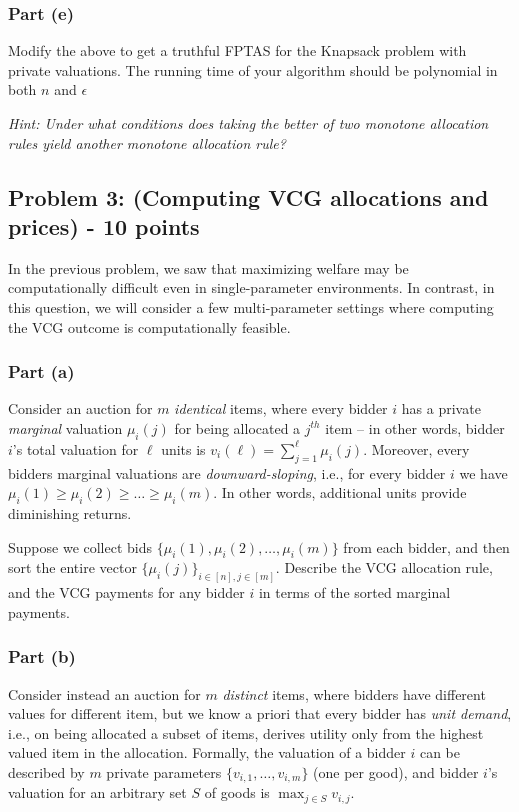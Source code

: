 \documentclass[letterpaper,11pt]{article}
\begin{document}
\subsubsection*{Part (e)} 
Modify the above to get a truthful FPTAS for the Knapsack problem with
private valuations. The running time of your algorithm should be polynomial in both $n$ and $\epsilon$

\noindent\emph{Hint: Under what conditions does taking the better of two monotone allocation rules yield another monotone allocation rule?}


\subsection*{Problem 3: (Computing VCG allocations and prices) - 10 points}

In the previous problem, we saw that maximizing welfare may be computationally difficult even in single-parameter environments. In contrast, in this question, we will consider a few multi-parameter settings where computing the VCG outcome is computationally feasible. 

\subsubsection*{Part (a)} 
Consider an auction for $m$ \emph{identical} items, where every bidder $i$ has a private \emph{marginal} valuation $\mu_i(j)$ for being allocated a $j^{th}$ item -- in other words, bidder $i$’s total valuation for $\ell$ units is $v_i(\ell) =\sum_{j=1}^{\ell}\mu_i(j)$. Moreover, every bidders marginal valuations are \emph{downward-sloping}, i.e., for every bidder $i$ we have$\mu_i(1)\geq \mu_i(2)\geq\ldots\geq \mu_i(m)$. In other words, additional units provide diminishing returns.

Suppose we collect bids $\{\mu_i(1),\mu_i(2),\ldots,\mu_i(m)\}$ from each bidder, and then sort the entire vector $\{\mu_i(j)\}_{i\in[n],j\in[m]}$. Describe the VCG allocation rule, and the VCG payments for any bidder $i$ in terms of the sorted marginal payments.

\subsubsection*{Part (b)} 
Consider instead an auction for $m$ \emph{distinct} items, where bidders have different values for different item, but we know a priori that every bidder has \emph{unit demand}, i.e., on being allocated a subset of items, derives utility only from the highest valued item in the allocation. Formally, the valuation of a bidder $i$ can be described by $m$ private parameters $\{v_{i,1},\ldots,v_{i,m}\}$ (one per good), and bidder $i$'s valuation for an arbitrary set $S$ of goods is $\max_{j\in S} v_{i,j}$.
\end{document}
